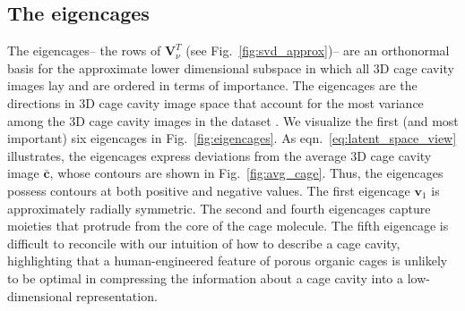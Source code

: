 \documentclass[journal=jacsat,manuscript=article,layout=traditional]{achemso}
\begin{document}
\subsection{The eigencages} The eigencages-- the rows of $\mathbf{V}_\nu^T$ (see Fig.~\ref{fig:svd_approx})-- are an orthonormal basis for the approximate lower dimensional subspace in which all 3D cage cavity images lay and are ordered in terms of importance. The eigencages are the directions in 3D cage cavity image space that account for the most variance among the 3D cage cavity images in the dataset \cite{strang1993introduction}. We visualize the first (and most important) six eigencages in Fig.~\ref{fig:eigencages}. As eqn.~\ref{eq:latent_space_view} illustrates, the eigencages express deviations from the average 3D cage cavity image $\bar{\mathbf{c}}$, whose contours are shown in Fig.~\ref{fig:avg_cage}. Thus, the eigencages possess contours at both positive and negative values. The first eigencage $\mathbf{v}_1$ is approximately radially symmetric. The second and fourth eigencages capture moieties that protrude from the core of the cage molecule. The fifth eigencage is difficult to reconcile with our intuition of how to describe a cage cavity, highlighting that a human-engineered feature of porous organic cages is unlikely to be optimal in compressing the information about a cage cavity into a low-dimensional representation.
\end{document}
